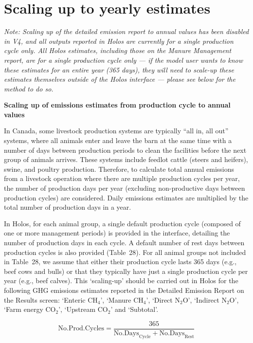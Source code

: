 \section{Scaling up to yearly estimates}
\label{sec:scaling-up}

\noindent\textit{Note: Scaling up of the detailed emission report to annual values has
been disabled in V4, and all outputs reported in Holos are currently for a single
production cycle only. All Holos estimates, including those on the Manure Management
report, are for a single production cycle only --- if the model user wants to know these
estimates for an entire year (365 days), they will need to scale-up these estimates
themselves outside of the Holos interface --- please see below for the method to do so.}

\noindent\textbf{Scaling up of emissions estimates from production cycle to annual values}

In Canada, some livestock production systems are typically ``all in, all out'' systems,
where all animals enter and leave the barn at the same time with a number of days between
production periods to clean the facilities before the next group of animals arrives.
These systems include feedlot cattle (steers and heifers), swine, and poultry production.
Therefore, to calculate total annual emissions from a livestock operation where there are
multiple production cycles per year, the number of production days per year (excluding
non-productive days between production cycles) are considered. Daily emissions estimates
are multiplied by the total number of production days in a year.

In Holos, for each animal group, a single default production cycle (composed of one or
more management periods) is provided in the interface, detailing the number of production
days in each cycle. A default number of rest days between production cycles is also
provided (Table~28). For all animal groups not included in Table~28, we assume that
either their production cycle lasts 365 days (e.g., beef cows and bulls) or that they
typically have just a single production cycle per year (e.g., beef calves). This
`scaling-up' should be carried out in Holos for the following GHG emissions estimates
reported in the Detailed Emission Report on the Results screen: `Enteric CH$_4$',
`Manure CH$_4$', `Direct N$_2$O', `Indirect N$_2$O', `Farm energy CO$_2$',
`Upstream CO$_2$' and `Subtotal'.

\begin{equation}
    \mathrm{No.Prod.Cycles} =
        \frac{365}{\mathrm{No.Days}_{\mathrm{Cycle}}
              + \mathrm{No.Days}_{\mathrm{Rest}}}
    \tag{Eq.\ 3.5.1.1}
\end{equation}


